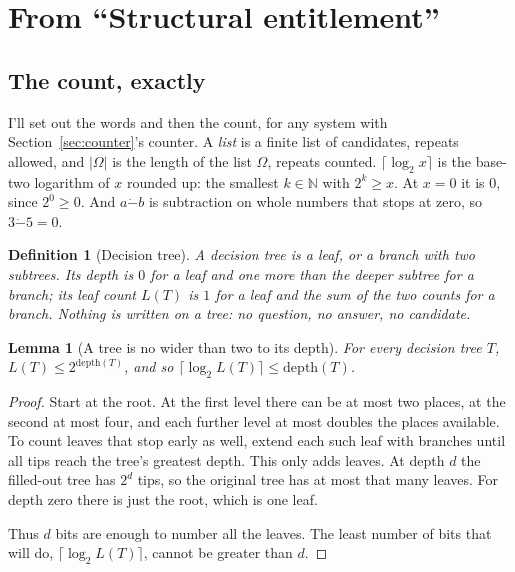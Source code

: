 \documentclass[11pt,twoside]{article}
\theoremstyle{thielethm}
\newtheorem{lemma}[theorem]{Lemma}
\theoremstyle{thieledef}
\newtheorem{definition}{Definition}[section]
\theoremstyle{thieledef}
\theoremstyle{thieledef}
\theoremstyle{thielethm}
\theoremstyle{thieleobs}
\theoremstyle{thielethm}
\begin{document}
\section{From ``Structural entitlement''}
\subsection{The count, exactly}

I'll set out the words and then the count, for any system with Section~\ref{sec:counter}'s counter. A \emph{list} is a finite list
of candidates, repeats allowed, and $|\Omega|$ is the length of the list $\Omega$, repeats
counted. $\lceil \log_2 x \rceil$ is the base-two logarithm of $x$ rounded up: the smallest
$k\in\mathbb{N}$ with $2^k \ge x$. At $x=0$ it is $0$, since $2^0 \ge 0$. And $a \mathbin{\dot{-}} b$ is subtraction on whole numbers that stops at
zero, so $3 \mathbin{\dot{-}} 5 = 0$.

\begin{definition}[Decision tree]\label{def:u08-dtree}
A \emph{decision tree} is a leaf, or a branch with two subtrees. Its depth is $0$ for a leaf and
one more than the deeper subtree for a branch; its leaf count $L(T)$ is $1$ for a leaf and the
sum of the two counts for a branch. Nothing is written on a tree: no question, no answer, no
candidate.
\end{definition}

\begin{lemma}[A tree is no wider than two to its depth]\label{lem:u08-tree-width}
For every decision tree $T$, $L(T) \le 2^{\mathrm{depth}(T)}$, and so
$\lceil \log_2 L(T) \rceil \le \mathrm{depth}(T)$.
\end{lemma}

\begin{proof}
Start at the root. At the first level there can be at most two places, at the
second at most four, and each further level at most doubles the places available.
To count leaves that stop early as well, extend each such leaf with branches
until all tips reach the tree's greatest depth. This only adds leaves.
At depth $d$ the filled-out tree has $2^d$ tips, so the original tree has at most
that many leaves. For depth zero there is just the root, which is one leaf.

Thus $d$ bits are enough to number all the leaves. The least number of bits
that will do, $\lceil\log_2 L(T)\rceil$, cannot be greater than $d$.
\end{proof}
\end{document}
